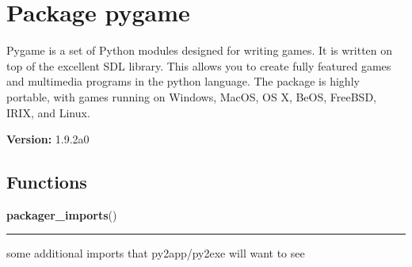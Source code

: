 %
%
%


\section{Package pygame}

    \label{pygame}
Pygame is a set of Python modules designed for writing games. It is written
on top of the excellent SDL library. This allows you to create fully 
featured games and multimedia programs in the python language. The package 
is highly portable, with games running on Windows, MacOS, OS X, BeOS, 
FreeBSD, IRIX, and Linux.

\textbf{Version:} 1.9.2a0





  \subsection{Functions}

    \label{pygame:packager_imports}

    \vspace{0.5ex}

\hspace{.8\funcindent}\begin{boxedminipage}{\funcwidth}

    \raggedright \textbf{packager\_imports}()

    \vspace{-1.5ex}

    \rule{\textwidth}{0.5\fboxrule}
\setlength{\parskip}{2ex}
    some additional imports that py2app/py2exe will want to see

\setlength{\parskip}{1ex}
    \end{boxedminipage}

    \label{pygame:warn_unwanted_files}

